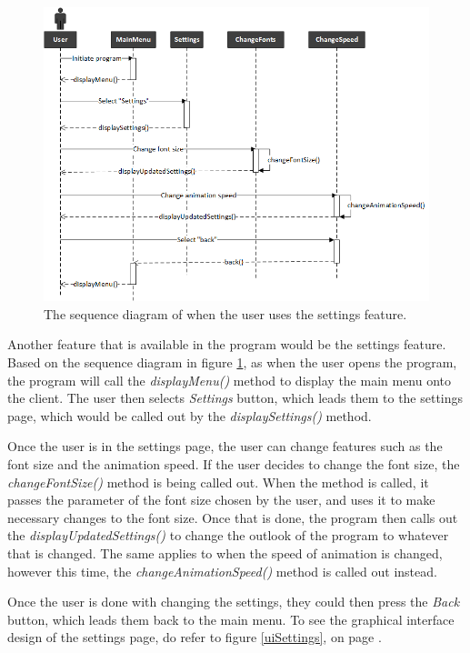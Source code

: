 \begin{figure}[H]
\centering
\hspace*{-1cm}
\includegraphics[scale=0.9]{images/report_images/sequenceDiagramSettings.png}
\caption{The sequence diagram of when the user uses the settings feature.}
\label{sequenceDiagramSettings}
\end{figure}

Another feature that is available in the program would be the settings feature. Based on the sequence diagram in figure \ref{sequenceDiagramSettings}, as when the user opens the program, the program will call the \textit{displayMenu()} method to display the main menu onto the client. The user then selects \textit{Settings} button, which leads them to the settings page, which would be called out by the \textit{displaySettings()} method.

Once the user is in the settings page, the user can change features such as the font size and the animation speed. If the user decides to change the font size, the \textit{changeFontSize()} method is being called out. When the method is called, it passes the parameter of the font size chosen by the user, and uses it to make necessary changes to the font size. Once that is done, the program then calls out the \textit{displayUpdatedSettings()} to change the outlook of the program to whatever that is changed. The same applies to when the speed of animation is changed, however this time, the \textit{changeAnimationSpeed()} method is called out instead. 

Once the user is done with changing the settings, they could then press the \textit{Back} button, which leads them back to the main menu. To see the graphical interface design of the settings page, do refer to figure \ref{uiSettings}, on page \pageref{uiSettings}.

